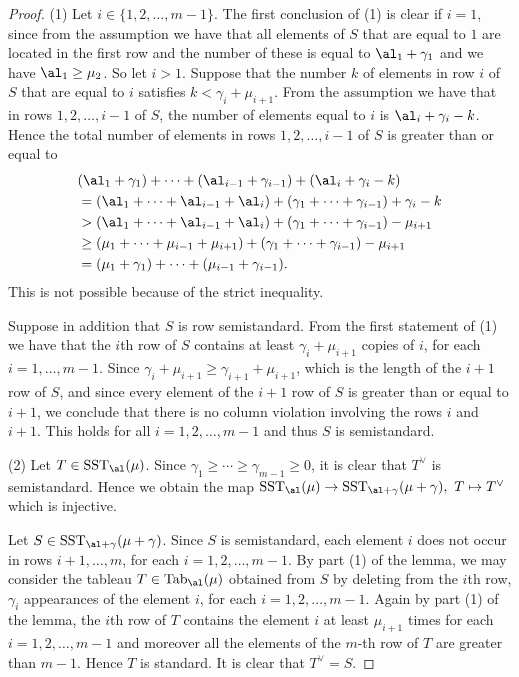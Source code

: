 		\begin{proof}(1) Let $i \in \{1,2,\dots,m-1\}$. The first conclusion of (1) is clear if $i=1$, since from the assumption we have that all elements of $S$ that are equal to $1$ are located in the first row and the number of these is equal to $\al_1+\gamma_1 $ and we have  $\al_1 \ge \mu_2$. So let $i>1$. Suppose that the number $k$ of elements in row $i$ of  $S$ that are equal to $i$ satisfies $k<\gamma_i +\mu_{i+1}$. From the assumption we have that in rows $1,2,\dots,i-1$ of $S$, the number of elements equal to $i$ is $\al_i+\gamma_i-k$. Hence the total number of elements in rows $1,2,\dots, i-1$ of $S$ is greater than or equal to \begin{align*}
				&(\al_1 +\gamma_1) + \cdots + (\al_{i-1}+\gamma_{i-1})+(\al_i+\gamma_i-k) \\&=(\al_1+\cdots+\al_{i-1}+\al_i) +(\gamma_1+\cdots+\gamma_{i-1})+\gamma_i-k \\ &>(\al_1+\cdots+\al_{i-1}+\al_i) +(\gamma_1+\cdots+\gamma_{i-1})-\mu_{i+1} \\ &\ge (\mu_1+\cdots+\mu_{i-1}+\mu_{i+1})+(\gamma_1+\cdots+\gamma_{i-1})-\mu_{i+1}\\&=(\mu_1+\gamma_1)+\cdots+(\mu_{i-1}+\gamma_{i-1}).\end{align*} This is not possible because of the strict inequality.
			
			Suppose in addition that $S$ is row semistandard. From the first statement of (1) we have that the $i$th row of $S$ contains at least $\gamma_i + \mu_{i+1}$ copies of $i$, for each $i=1,\dots,m-1$. Since $\gamma_i + \mu_{i+1} \ge \gamma_{i+1}+\mu_{i+1}$, which is the length of the $i+1$ row of $S$, and since every element of the $i+1$ row of $S$ is greater than or equal to $i+1$, we conclude that there is no column violation involving the rows $i$ and $i+1$. This holds for all $i=1,2,\dots,m-1$ and thus $S$ is semistandard.
			
			(2) Let $T \in \mathrm{SST}_{\al}(\mu)$. Since $\gamma_1 \ge \cdots \ge \gamma_{m-1} \ge 0$, it is clear that $T^{\vee}$ is semistandard. Hence we obtain the map $\mathrm{SST}_{\al}(\mu) \to \mathrm{SST}_{\al+\gamma}(\mu+\gamma), \ T \mapsto T^{\vee}$ which is injective.
			
			Let  $S \in \mathrm{SST}_{\al+\gamma}(\mu+\gamma)$. Since $S$ is semistandard, each element $i$ does not occur in rows $i+1,\dots,m$, for each $i=1,2,\dots,m-1$. By part (1) of the lemma, we may consider the tableau $T \in \mathrm{Tab}_\al(\mu)$ obtained from $S$ by deleting from the $i$th row, $\gamma_i$ appearances of the element $i$, for each $i=1,2,\dots,m-1$. Again by part (1) of the lemma, the $i$th row of $T$ contains the element $i$ at least $\mu_{i+1}$ times for each $i=1,2,\dots,m-1$ and moreover all the elements of the $m$-th row of $T$ are greater than $m-1$. Hence $T$ is standard. It is clear that $T^{\vee}=S$.
		\end{proof}
		
